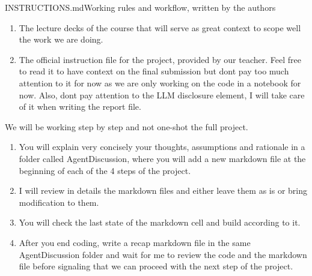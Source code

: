 \begin{mdfile}{INSTRUCTIONS.md}{Working rules and workflow, written by the authors}

\begin{enumerate}
\def\labelenumi{\arabic{enumi}.}
\tightlist
\item
  The lecture decks of the course that will serve as great context to scope well the work we are doing.
\item
  The official instruction file for the project, provided by our teacher. Feel free to read it to have context on the final submission but don\textquotesingle t pay too much attention to it for now as we are only working on the code in a notebook for now. Also, don\textquotesingle t pay attention to the LLM disclosure element, I will take care of it when writing the report file.
\end{enumerate}


We will be working step by step and not one-shot the full project.

\begin{enumerate}
\def\labelenumi{\arabic{enumi}.}
\tightlist
\item
  You will explain very concisely your thoughts, assumptions and rationale in a folder called AgentDiscussion, where you will add a new markdown file at the beginning of each of the 4 steps of the project.
\item
  I will review in details the markdown files and either leave them as is or bring modification to them.
\item
  You will check the last state of the markdown cell and build according to it.
\item
  After you end coding, write a recap markdown file in the same AgentDiscussion folder and wait for me to review the code and the markdown file before signaling that we can proceed with the next step of the project.
\end{enumerate}
\end{mdfile}


